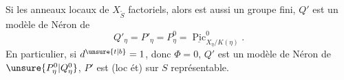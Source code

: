 Si  les anneaux locaux de $X_{\widetilde S}$ factoriels, alors  est aussi un groupe fini,
$Q'$ est un modèle de Néron de
\[
Q'_\eta=P'_\eta=P^0_\eta=\underline{\operatorname{Pic}}^0_{X_\eta/K(\eta)}.
\]
En particulier, si $d^{\unsure{t|b}}=1$, donc $\Phi=0$, $Q'$ est un modèle de Néron de $\unsure{P^0_\eta|Q^0_\eta}$,  $P'$ est (loc ét) sur $S$ représentable.
